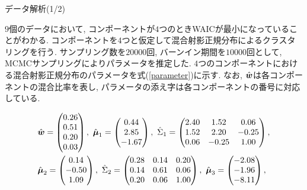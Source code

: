 \documentclass[dvipdfmx]{beamer} %
\newcommand{\bm}[1]{\mbox{\boldmath $#1$}}
\begin{document}
\begin{frame}{データ解析(1/2)}

$9$個のデータにおいて, コンポーネントが$4$つのときWAICが最小になっていることがわかる. コンポーネントを$4$つと仮定して混合射影正規分布によるクラスタリングを行う. サンプリング数を$20000$回, バーンイン期間を$10000$回として, MCMCサンプリングによりパラメータを推定した. $4$つのコンポーネントにおける混合射影正規分布のパラメータを式(\ref{parameter})に示す. なお, $\hat {\bm w}$は各コンポーネントの混合比率を表し, パラメータの添え字は各コンポーネントの番号に対応している.

\footnotesize %
\begin{equation}
\label{parameter}
\begin{split}
&\hat {\bm w} = \begin{pmatrix} 0.26 \\ 0.51 \\ 0.20 \\ 0.03 \\ \end{pmatrix},\ 
\hat{\bm \mu}_1 = \begin{pmatrix} 0.44 \\ 2.85 \\ -1.67 \\ \end{pmatrix},\ 
\hat \Sigma_1 = \begin{pmatrix}  2.40 & 1.52 &  0.06 \\ 1.52 & 2.20 & -0.25 \\ 0.06 & -0.25 &1.00 \\ \end{pmatrix},\\ 
&\hat{\bm \mu}_2 = \begin{pmatrix} 0.14 \\ -0.50 \\ 1.09 \\ \end{pmatrix},\ 
\hat \Sigma_2 = \begin{pmatrix}   0.28  & 0.14 &  0.20 \\ 0.14 & 0.61 & 0.06 \\  0.20 & 0.06 &1.00 \\ \end{pmatrix},\ 
\hat{\bm \mu}_3 = \begin{pmatrix} -2.08  \\ -1.96 \\ -8.11 \\ \end{pmatrix},\\ 

\end{split}
\end{equation}
\end{frame}
\end{document}

